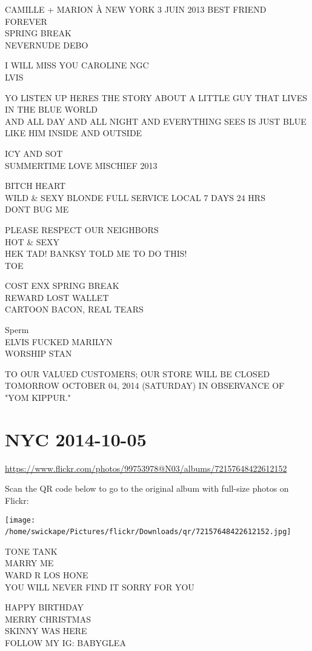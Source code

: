 \documentclass[10pt,letterpaper]{article}
\begin{document}
CAMILLE + MARION À NEW YORK 3 JUIN 2013 BEST FRIEND FOREVER\\
SPRING BREAK\\
NEVERNUDE DEBO

I WILL MISS YOU CAROLINE NGC\\
LVIS

YO LISTEN UP HERES THE STORY ABOUT A LITTLE GUY THAT LIVES IN THE BLUE WORLD\\
AND ALL DAY AND ALL NIGHT AND EVERYTHING SEES IS JUST BLUE LIKE HIM INSIDE AND OUTSIDE

ICY AND SOT\\
SUMMERTIME LOVE MISCHIEF 2013

BITCH HEART\\
WILD \& SEXY BLONDE FULL SERVICE LOCAL 7 DAYS 24 HRS\\
DONT BUG ME

PLEASE RESPECT OUR NEIGHBORS\\
HOT \& SEXY\\
HEK TAD! BANKSY TOLD ME TO DO THIS!\\
TOE

COST ENX SPRING BREAK\\
REWARD LOST WALLET\\
CARTOON BACON, REAL TEARS

Sperm\\
ELVIS FUCKED MARILYN\\
WORSHIP STAN

TO OUR VALUED CUSTOMERS; OUR STORE WILL BE CLOSED TOMORROW OCTOBER 04, 2014 (SATURDAY) IN OBSERVANCE OF "YOM KIPPUR."
\

\section*{NYC 2014-10-05}

\url{https://www.flickr.com/photos/99753978@N03/albums/72157648422612152}

Scan the QR code below to go to the original album with full-size photos on Flickr:

\texttt{[image: /home/swickape/Pictures/flickr/Downloads/qr/72157648422612152.jpg]}
\

TONE TANK\\
MARRY ME\\
WARD R LOS HONE\\
YOU WILL NEVER FIND IT SORRY FOR YOU

HAPPY BIRTHDAY\\
MERRY CHRISTMAS\\
SKINNY WAS HERE\\
FOLLOW MY IG: BABYGLEA
\end{document}
